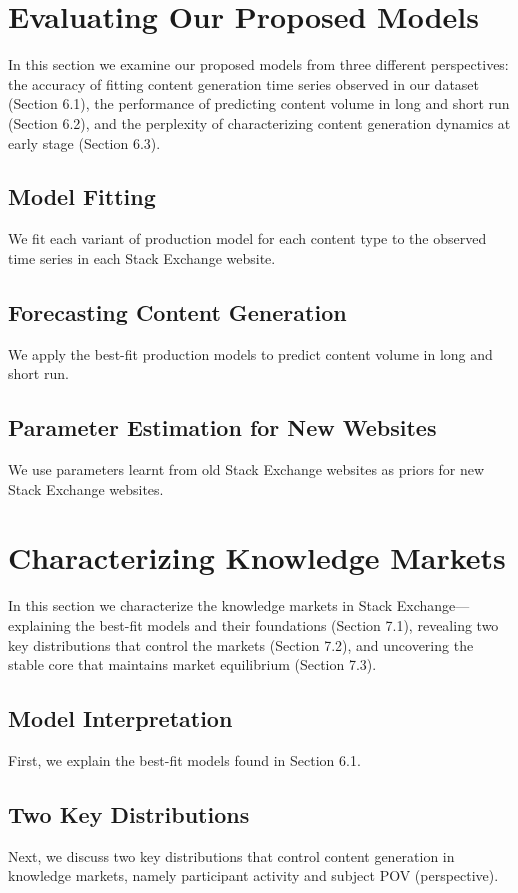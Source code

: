 \section{Evaluating Our Proposed Models}
In this section we examine our proposed models from three different perspectives: the accuracy of fitting content generation time series observed in our dataset (Section 6.1), the performance of predicting content volume in long and short run (Section 6.2), and the perplexity of characterizing content generation dynamics at early stage (Section 6.3).
\subsection{Model Fitting}
We fit each variant of production model for each content type to the observed time series in each Stack Exchange website. 
\subsection{Forecasting Content Generation} 
We apply the best-fit production models to predict content volume in long and short run. 
\subsection{Parameter Estimation for New Websites} 
We use parameters learnt from old Stack Exchange websites as priors for new Stack Exchange websites.

\section{Characterizing Knowledge Markets}
In this section we characterize the knowledge markets in Stack Exchange---explaining the best-fit models and their foundations (Section 7.1), revealing two key distributions that control the markets (Section 7.2), and uncovering the stable core that maintains market equilibrium (Section 7.3).
\subsection{Model Interpretation} 
First, we explain the best-fit models found in Section 6.1. 
\subsection{Two Key Distributions} 
Next, we discuss two key distributions that control content generation in knowledge markets, namely participant activity and subject POV (perspective). 
